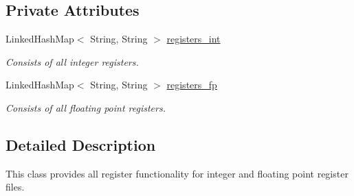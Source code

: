 \subsection*{\-Private \-Attributes}
\begin{DoxyCompactItemize}
\item 
\-Linked\-Hash\-Map$<$ \-String, \-String $>$ \hyperlink{classRegisterFiles_af43eb5d927643c8bf16eb474ca153fdd}{registers\-\_\-int}
\begin{DoxyCompactList}\small\item\em \-Consists of all integer registers. \end{DoxyCompactList}\item 
\-Linked\-Hash\-Map$<$ \-String, \-String $>$ \hyperlink{classRegisterFiles_ad4dcec0be4e24ff005b848d953a3c73b}{registers\-\_\-fp}
\begin{DoxyCompactList}\small\item\em \-Consists of all floating point registers. \end{DoxyCompactList}\end{DoxyCompactItemize}


\subsection{\-Detailed \-Description}
\-This class provides all register functionality for integer and floating point register files. 

